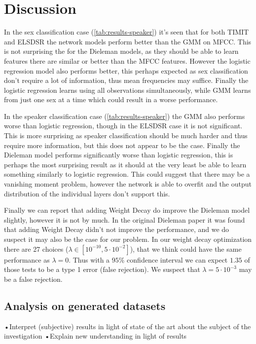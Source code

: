 \section{Discussion}

In the sex classification case (\cref{tab:results-speaker}) it's seen that for both TIMIT and ELSDSR the network models perform better than the GMM on MFCC. This is not surprising the for the Dieleman models, as they should be able to learn features there are similar or better than the MFCC features. However the logistic regression model also performs better, this perhaps expected as sex classification don't require a lot of information, thus mean frequencies may suffice. Finally the logistic regression learns using all observations simultaneously, while GMM learns from just one sex at a time which could result in a worse performance.

In the speaker classification case (\cref{tab:results-speaker}) the GMM also performs worse than logistic regression, though in the ELSDSR case it is not significant. This is more surprising as speaker classification should be much harder and thus require more information, but this does not appear to be the case. Finally the Dieleman model performs significantly worse than logistic regression, this is perhaps the most surprising result as it should at the very least be able to learn something similarly to logistic regression. This could suggest that there may be a vanishing moment problem, however the network is able to overfit and the output distribution of the individual layers don't support this.

Finally we can report that adding Weight Decay do improve the Dieleman model slightly, however it is not by much. In the original Dieleman paper \cite{dieleman} it was found that adding Weight Decay didn't not improve the performance, and we do suspect it may also be the case for our problem. In our weight decay optimization there are 27 choices ($\lambda \in [10^{-10}, 5 \cdot 10^{-2}]$), that we think could have the same performance as $\lambda = 0$. Thus with a $95\%$ confidence interval we can expect $1.35$ of those tests to be a type 1 error (false rejection). We suspect that $\lambda = 5 \cdot 10^{-3}$ may be a false rejection.

\subsection{Analysis on generated datasets}


•Interpret (subjective) results in light of state of the art about the subject of
the investigation
•Explain new understanding in light of results
